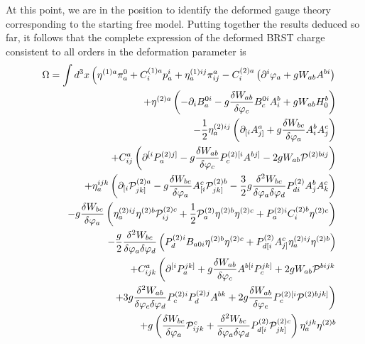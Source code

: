 \documentclass[a4paper,12pt]{article}
\begin{document}
At this point, we are in the position to identify the deformed gauge theory
corresponding to the starting free model. Putting together the results
deduced so far, it follows that the complete expression of the deformed BRST
charge consistent to all orders in the deformation parameter is 
\begin{eqnarray}
&&\Omega =\int d^{3}x\left( \eta ^{(1)a}\pi
_{a}^{0}+C_{i}^{(1)a}p_{a}^{i}+\eta _{a}^{(1)ij}\pi
_{ij}^{a}-C_{i}^{(2)a}\left( \partial ^{i}\varphi _{a}+gW_{ab}A^{bi}\right)
\right.  \nonumber \\
&&+\eta ^{(2)a}\left( - \partial _{i}B_{a}^{0i}-g\frac{\delta W_{ab}}{\delta
\varphi _{c}}B_{c}^{0i}A_{i}^{b}+gW_{ab}H_{0}^{b}\right)  \nonumber \\
&&-\frac{1}{2}\eta _{a}^{(2)ij}\left( \partial _{[i}A_{j]}^{a}+ g\frac{%
\delta W_{bc}}{\delta \varphi _{a}}A_{i}^{b}A_{j}^{c}\right)  \nonumber \\
&&+C_{ij}^{a}\left( \partial ^{[i}P_{a}^{(2)j]}- g\frac{\delta W_{ab}}{%
\delta \varphi _{c}}P_{c}^{(2)[i}A^{bj]}-2gW_{ab}\mathcal{P}^{(2)bij}\right)
\nonumber \\
&&+\eta _{a}^{ijk}\left( \partial _{[i} \mathcal{P}_{jk]}^{(2)a}-g\frac{%
\delta W_{bc}}{\delta \varphi _{a}}A_{[i}^{c}\mathcal{P}_{jk]}^{(2)b}-\frac{3%
}{2}g\frac{\delta ^{2}W_{bc}}{\delta \varphi _{a}\delta \varphi _{d}}%
P_{di}^{(2)}A_{j}^{b}A_{k}^{c}\right)  \nonumber \\
&&-g\frac{\delta W_{bc}}{\delta \varphi _{a}}\left( \eta _{a}^{(2)ij}\eta
^{(2)b}\mathcal{P}_{ij}^{(2)c}+\frac{1}{2}\mathcal{P}_{a}^{(2)}\eta
^{(2)b}\eta ^{(2)c}+P_{a}^{(2)i}C_{i}^{(2)b}\eta ^{(2)c}\right)  \nonumber \\
&&-\frac{g}{2}\frac{\delta ^{2} W_{bc}}{\delta \varphi _{a}\delta \varphi
_{d}}\left( P_{d}^{(2)i}B_{a0i}\eta ^{(2)b}\eta
^{(2)c}+P_{d[i}^{(2)}A_{j]}^{c}\eta _{a}^{(2)ij}\eta ^{(2)b}\right) 
\nonumber \\
&&+C_{ijk}^{a}\left( \partial ^{[i}P_{a}^{jk]}+ g\frac{\delta W_{ab}}{\delta
\varphi _{c}}A^{b[i}P_{c}^{jk]}+2gW_{ab}\mathcal{P}^{bijk}\right.  \nonumber
\\
&&\left. +3g\frac{\delta ^{2}W_{ab}}{\delta \varphi _{c}\delta \varphi _{d}}%
P_{c}^{(2)i}P_{d}^{(2)j}A^{bk}+2g\frac{\delta W_{ab}}{\delta \varphi _{c}}%
P_{c}^{(2)[i}\mathcal{P}^{(2)bjk]}\right)  \nonumber \\
&&+g\left( \frac{\delta W_{bc}}{\delta \varphi _{a}}\mathcal{P}_{ijk}^{c}+%
\frac{\delta ^{2}W_{bc}}{\delta \varphi _{a}\delta \varphi _{d}}P_{d[i}^{(2)}%
\mathcal{P}_{jk]}^{(2)c}\right) \eta _{a}^{ijk}\eta ^{(2)b}  \nonumber \\

\end{eqnarray}
\end{document}
